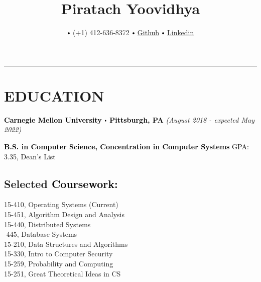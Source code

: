 \documentclass[10pt]{article}
\title{\bfseries\Huge Piratach Yoovidhya}
\author{
  \small \myemail
   $\sbullet[.75]$
   (+1) 412-636-8372
   $\sbullet[.75]$
  \href{https://github.com/Piratach}{Github}
   $\sbullet[.75]$
  \href{https://www.linkedin.com/in/piratach-yoovidhya/}
{Linkedin}
}
\date{}
\newcommand\sbullet[1][.5]{\mathbin{\vcenter{\hbox{\scalebox{#1}{$\bullet$}}}}}
\begin{document}
  \maketitle
  \thispagestyle{empty}
  \vspace*{-1.0cm}
  \hrule
  \vspace*{-0.15cm}

  \section*{\large \textcolor{lighterB}{EDUCATION}}
  \vspace*{-0.3cm}
  \textbf{\large \textcolor{Black}{Carnegie Mellon University $\sbullet$ Pittsburgh, PA}} \hfill \textit{(August 2018 - expected May 2022)}

  \vspace{0.05cm}

  \textcolor{Black}{\textbf{B.S. in Computer Science, Concentration in Computer Systems} \hfill GPA: 3.35, Dean's List}

  \vspace{0.2cm}

  \vspace*{-0.5cm}

  \subsection*{Selected \textcolor{Black}{Coursework:}}

    \vspace*{-0.55cm}
    \begin{multicols}{2}
       15-410, Operating Systems (Current) \\
       15-451, Algorithm Design and Analysis \\
       15-440, Distributed Systems \\
       -445, Database Systems \\
       15-210, Data Structures and Algorithms \\
       15-330, Intro to Computer Security \\
       15-259, Probability and Computing \\
       15-251, Great Theoretical Ideas in CS
    \end{multicols}
\end{document}
